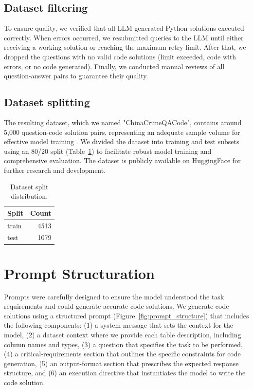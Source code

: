 \subsection{Dataset filtering}

To ensure quality, we verified that all LLM-generated Python solutions executed correctly. When errors occurred, we resubmitted queries to the LLM until either receiving a working solution or reaching the maximum retry limit. After that, we dropped the questions with no valid code solutions (limit exceeded, code with errors, or no code generated). Finally, we conducted manual reviews of all question-answer pairs to guarantee their quality.

\subsection{Dataset splitting}

The resulting dataset, which we named "ChinaCrimeQACode", contains around 5,000 question-code solution pairs, representing an adequate sample volume for effective model training \citep{Unsloth2024Dataset1}. We divided the dataset into training and test subsets using an 80/20 split (Table~\ref{tab:dataset_split}) to facilitate robust model training and comprehensive evaluation. The dataset is publicly available on HuggingFace for further research and development.

\begin{table}[H]
\centering
\begin{tabular}{lr}
\hline
\textbf{Split} & \textbf{Count} \\
\hline
train & 4513 \\
test  & 1079 \\
\hline
\end{tabular}
\caption{Dataset split distribution.}
\label{tab:dataset_split}
\end{table}



\section{Prompt Structuration}
Prompts were carefully designed to ensure the model understood the task requirements and could generate accurate code solutions.  
We generate code solutions using a structured prompt (Figure~\ref{fig:prompt_structure}) that includes the following components:  
(1) a system message that sets the context for the model,  
(2) a dataset context where we provide each table description, including column names and types,  
(3) a question that specifies the task to be performed,  
(4) a critical-requirements section that outlines the specific constraints for code generation,  
(5) an output-format section that prescribes the expected response structure, and  
(6) an execution directive that instantiates the model to write the code solution.

